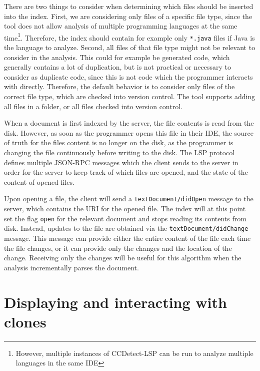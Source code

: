 There are two things to consider when determining which files should be inserted into the
index. First, we are considering only files of a specific file type, since the tool does
not allow analysis of multiple programming languages at the same time\footnote{However,
    multiple instances of CCDetect-LSP can be run to analyze multiple languages in
the same IDE}. Therefore, the index should contain for example only \verb|*.java| files if
Java is the language to analyze. Second, all files of that file type might not be relevant
to consider in the analysis. This could for example be generated code, which generally
contains a lot of duplication, but is not practical or necessary to consider as duplicate
code, since this is not code which the programmer interacts with directly. Therefore, the
default behavior is to consider only files of the correct file type, which are checked
into version control. The tool supports adding all files in a folder, or all files checked
into version control.

When a document is first indexed by the server, the file contents is read from the disk.
However, as soon as the programmer opens this file in their IDE, the source of truth for
the files content is no longer on the disk, as the programmer is changing the file
continuously before writing to the disk. The LSP protocol defines multiple JSON-RPC
messages which the client sends to the server in order for the server to keep track of
which files are opened, and the state of the content of opened files.

Upon opening a file, the client will send a \verb|textDocument/didOpen| message to the
server, which contains the URI for the opened file. The index will at this point set the
flag \verb|open| for the relevant document and stops reading its contents from disk.
Instead, updates to the file are obtained via the \verb|textDocument/didChange| message.
This message can provide either the entire content of the file each time the file changes,
or it can provide only the changes and the location of the change. Receiving only the
changes will be useful for this algorithm when the analysis incrementally parses the
document.

\section{Displaying and interacting with clones}

